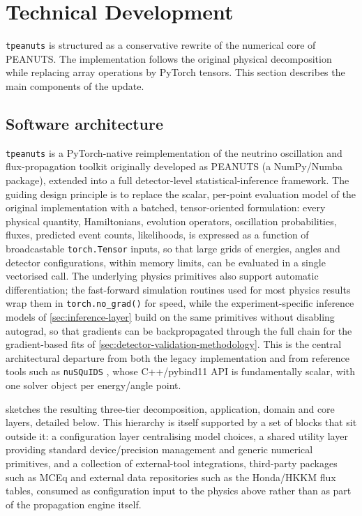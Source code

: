 \section{Technical Development}

\texttt{tpeanuts} is structured as a conservative rewrite of the numerical core of PEANUTS. The implementation follows the original physical decomposition while replacing array operations by PyTorch tensors. This section describes the main components of the update.

\subsection{Software architecture}

\texttt{tpeanuts} is a PyTorch-native reimplementation of the neutrino oscillation and flux-propagation toolkit originally developed as PEANUTS (a NumPy/Numba package), extended into a full detector-level statistical-inference framework. The guiding design principle is to replace the scalar, per-point evaluation model of the original implementation with a batched, tensor-oriented formulation: every physical quantity, Hamiltonians, evolution operators, oscillation probabilities, fluxes, predicted event counts, likelihoods, is expressed as a function of broadcastable \texttt{torch.Tensor} inputs, so that large grids of energies, angles and detector configurations, within memory limits, can be evaluated in a single vectorised call. The underlying physics primitives also support automatic differentiation; the fast-forward simulation routines used for most physics results wrap them in \texttt{torch.no\_grad()} for speed, while the experiment-specific inference models of \cref{sec:inference-layer} build on the same primitives without disabling autograd, so that gradients can be backpropagated through the full chain for the gradient-based fits of \cref{sec:detector-validation-methodology}. This is the central architectural departure from both the legacy implementation and from reference tools such as \texttt{nuSQuIDS} \parencite{nuSQuIDS}, whose C++/pybind11 API is fundamentally scalar, with one solver object per energy/angle point.

 sketches the resulting three-tier decomposition, application, domain and core layers, detailed below. This hierarchy is itself supported by a set of blocks that sit outside it: a configuration layer centralising model choices, a shared utility layer providing standard device/precision management and generic numerical primitives, and a collection of external-tool integrations, third-party packages such as MCEq and external data repositories such as the Honda/HKKM flux tables, consumed as configuration input to the physics above rather than as part of the propagation engine itself.

